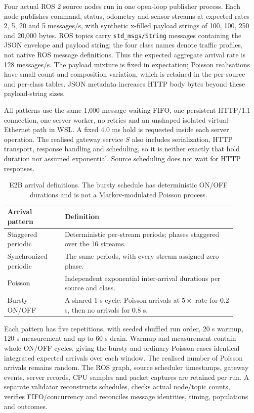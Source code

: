 Four actual ROS 2 source nodes run in one open-loop publisher process. Each node publishes command, status, odometry and sensor streams at expected rates 2, 5, 20 and 5 messages/s, with synthetic x-filled payload strings of 100, 100, 250 and 20,000 bytes. ROS topics carry \texttt{std\_msgs/String} messages containing the JSON envelope and payload string; the four class names denote traffic profiles, not native ROS message definitions. Thus the expected aggregate arrival rate is 128 messages/s. The payload mixture is fixed in expectation; Poisson realisations have small count and composition variation, which is retained in the per-source and per-class tables. JSON metadata increases HTTP body bytes beyond these payload-string sizes.

All patterns use the same 1,000-message waiting FIFO, one persistent HTTP/1.1 connection, one server worker, no retries and an unshaped isolated virtual-Ethernet path in WSL. A fixed 4.0 ms hold is requested inside each server operation. The realised gateway service $S$ also includes serialization, HTTP transport, response handling and scheduling, so it is neither exactly that hold duration nor assumed exponential. Source scheduling does not wait for HTTP responses.

\begin{table}[H]\centering
\small
\setlength{\tabcolsep}{5pt}
\begin{tabular}{p{0.23\linewidth}p{0.69\linewidth}}
\hline
Arrival pattern & Definition \\
\hline
Staggered periodic & Deterministic per-stream periods; phases staggered over the 16 streams. \\
Synchronized periodic & The same periods, with every stream assigned zero phase. \\
Poisson & Independent exponential inter-arrival durations per source and class. \\
Bursty ON/OFF & A shared 1 s cycle: Poisson arrivals at $5\times$ rate for 0.2 s, then no arrivals for 0.8 s. \\
\hline
\end{tabular}
\caption{E2B arrival definitions. The bursty schedule has deterministic ON/OFF durations and is not a Markov-modulated Poisson process.}
\label{tab:patterns}
\end{table}

Each pattern has five repetitions, with seeded shuffled run order, 20 s warmup, 120 s measurement and up to 60 s drain. Warmup and measurement contain whole ON/OFF cycles, giving the bursty and ordinary Poisson cases identical integrated expected arrivals over each window. The realised number of Poisson arrivals remains random. The ROS graph, source scheduler timestamps, gateway events, server records, CPU samples and packet captures are retained per run. A separate validator reconstructs schedules, checks actual node/topic counts, verifies FIFO/concurrency and reconciles message identities, timing, populations and outcomes.


